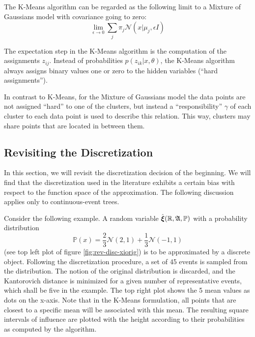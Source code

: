 The K-Means algorithm can be regarded as the following limit to a Mixture of Gaussians model with covariance going to zero:
\begin{equation}
  \label{eq:23}
  \lim\limits_{\epsilon\rightarrow 0}\sum_j\pi_j\mathcal{N}(x| \mu_j,\epsilon I)
\end{equation}

The expectation step in the K-Means algorithm is the computation of the assignments $z_{ij}$.
Instead of probabilities $p(z_{ik}|x,\theta)$, the K-Means algorithm always assigns binary values one or zero to the hidden variables (``hard assignments'').

In contrast to K-Means, for the Mixture of Gaussians model the data points are not assigned ``hard'' to one of the clusters, but instead a ``responsibility'' $\gamma$ of each cluster to each data point is used to describe this relation.
This way, clusters may share points that are located in between them.
\subsection{Revisiting the Discretization}
\label{sec:revisiting-discretization}
In this section, we will revisit the discretization decision of the beginning.
We will find that the discretization used in the literature exhibits a certain bias with respect to the function space of the approximation.
The following discussion applies only to continuous-event trees.

Consider the following example.
A random variable $\hat{\boldsymbol\xi}(\mathbb{R}, \mathfrak{A}, \mathbb{P})$ with a probability distribution
\begin{equation}
  \label{eq:24}
  \mathbb{P}(x) = \frac{2}{3}\mathcal{N}(2,1) + \frac{1}{3}\mathcal{N}(-1,1)
\end{equation}
(see top left plot of figure \ref{fig:rev-disc-xiorig}) is to be approximated by a discrete object.
Following the discretization procedure, a set of 45 events is sampled from the distribution.
The notion of the original distribution is discarded, and the Kantorovich distance is minimized for a given number of representative events, which shall be five in the example.
The top right plot shows the 5 mean values as dots on the x-axis.
Note that in the K-Means formulation, all points that are closest to a specific mean will be associated with this mean.
The resulting square intervals of influence are plotted with the height according to their probabilities as computed by the algorithm.

